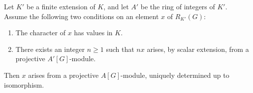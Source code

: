 Let $K'$ be a finite extension of $K$, and let $A'$ be the ring of integers of $K'$. Assume the following two conditions on an element $x$ of $R_{K'}(G)$:
\begin{enumerate}
\item[(a)] The character of $x$ has values in $K$.
\item[(b)] There exists an integer $n \geqslant 1$ such that $nx$ arises, by scalar extension, from a projective $A'[G]$-module.
\end{enumerate}
Then $x$ arises from a projective $A[G]$-module, uniquely determined up to isomorphism.
